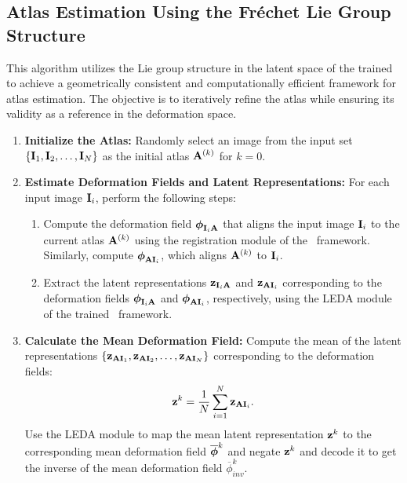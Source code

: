 

\subsection{Atlas Estimation Using the Fréchet Lie Group Structure}\label{atlas_est_algo}

This algorithm utilizes the Lie group structure in the latent space of the trained \model to achieve a geometrically consistent and computationally efficient framework for atlas estimation. The objective is to iteratively refine the atlas while ensuring its validity as a reference in the deformation space.

\begin{enumerate}
    \item \textbf{Initialize the Atlas:} Randomly select an image from the input set \( \{ \mathbf{I}_1, \mathbf{I}_2, \dots, \mathbf{I}_N \} \) as the initial atlas \( \mathbf{A}^{(k)} \) for \(k = 0\).

    \item \textbf{Estimate Deformation Fields and Latent Representations:} For each input image \( \mathbf{I}_i \), perform the following steps:
    \begin{enumerate}
        \item Compute the deformation field \( {\boldsymbol{\phi}}_{\mathbf{I}_{i}\mathbf{A}} \) that aligns the input image \( \mathbf{I}_i \) to the current atlas \( \mathbf{A}^{(k)} \) using the registration module of the \model~framework. Similarly, compute \( {\boldsymbol{\phi}}_{\mathbf{A}\mathbf{I}_{i}} \), which aligns \( \mathbf{A}^{(k)} \) to \( \mathbf{I}_i \).
        \item Extract the latent representations \( \mathbf{z}_{\mathbf{I}_{i}\mathbf{A}} \) and \( \mathbf{z}_{\mathbf{A}\mathbf{I}_{i}} \) corresponding to the deformation fields \( {\boldsymbol{\phi}}_{\mathbf{I}_{i}\mathbf{A}} \) and \( {\boldsymbol{\phi}}_{\mathbf{A}\mathbf{I}_{i}} \), respectively, using the LEDA module of the trained \model~framework.
    \end{enumerate}

    \item \textbf{Calculate the Mean Deformation Field:} Compute the mean of the latent representations \( \{\mathbf{z}_{\mathbf{A}\mathbf{I}_{1}}, \mathbf{z}_{\mathbf{A}\mathbf{I}_{2}}, \dots, \mathbf{z}_{\mathbf{A}\mathbf{I}_{N}}\} \) corresponding to the deformation fields:
    \[
    \mathbf{z}^k = \frac{1}{N} \sum_{i=1}^N \mathbf{z}_{\mathbf{A}\mathbf{I}_{i}}.
    \]
    Use the LEDA module to map the mean latent representation \( \mathbf{z}^k \) to the corresponding mean deformation field \( \overline{{\boldsymbol{\phi}}}^{k} \) and negate \(\mathbf{z}^k\) and decode it to get the inverse of the mean deformation field \(\overline{\phi}_{inv}^{k}\). 


\end{enumerate}
